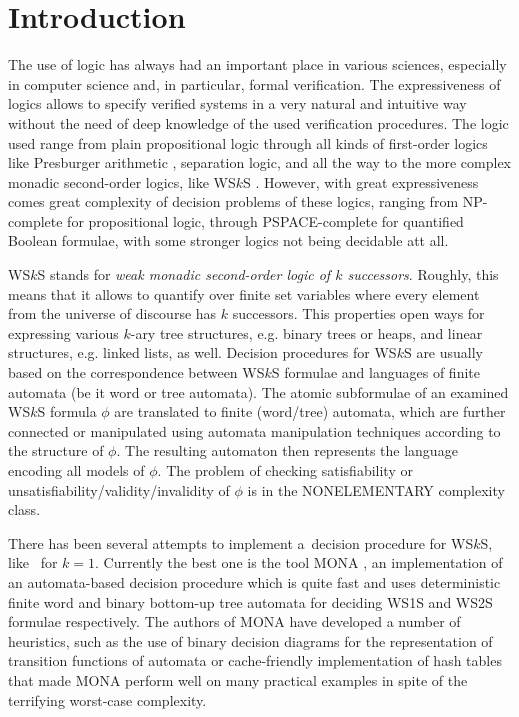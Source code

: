 \chapter{Introduction}
 
The use of logic has always had an important place in various sciences,
especially in computer science and, in particular, formal verification. The
expressiveness of logics allows to specify verified systems in a very natural
and intuitive way without the need of deep knowledge of the used verification
procedures. The logic used range from plain propositional logic through all
kinds of first-order logics like Presburger arithmetic \cite{presburger},
separation logic, and all the way to the more complex monadic second-order
logics, like WS$k$S \cite{wsks}. However, with great expressiveness comes great
complexity of decision problems of these logics, ranging from NP-complete for
propositional logic, through PSPACE-complete for quantified Boolean formulae,
with some stronger logics not being decidable att all.

WS$k$S stands for \emph{weak monadic second-order logic of $k$ successors}.
Roughly, this means that it allows to quantify over finite set variables where
every element from the universe of discourse has $k$ successors. This properties
open ways for expressing various $k$-ary tree structures, e.g. binary trees or
heaps, and linear structures, e.g. linked lists, as well. Decision procedures
for WS$k$S are usually based on the correspondence between WS$k$S formulae and
languages of finite automata (be it word or tree automata). The atomic
subformulae of an
examined WS$k$S formula $\phi$ are translated to finite (word/tree)
automata, which are further connected or manipulated using automata manipulation
techniques according to the structure of $\phi$. The resulting automaton then
represents the language encoding all models of $\phi$. The problem of checking
satisfiability or unsatisfiability/validity/invalidity of $\phi$ is in the
NONELEMENTARY complexity class.

There has been several attempts to implement a~decision procedure for WS$k$S,
like~\cite{nfa} for $k = 1$. Currently the best one is the tool \textsc{MONA}
\cite{mona}, an implementation of an automata-based decision procedure which is
quite fast and uses deterministic finite word and binary bottom-up tree automata
for deciding WS1S and WS2S formulae respectively. The authors of \textsc{MONA}
have developed a number of heuristics, such as the use of binary decision
diagrams for the representation of transition functions of automata or
cache-friendly implementation of hash tables that made \textsc{MONA} perform
well on many practical examples in spite of the terrifying worst-case
complexity.

